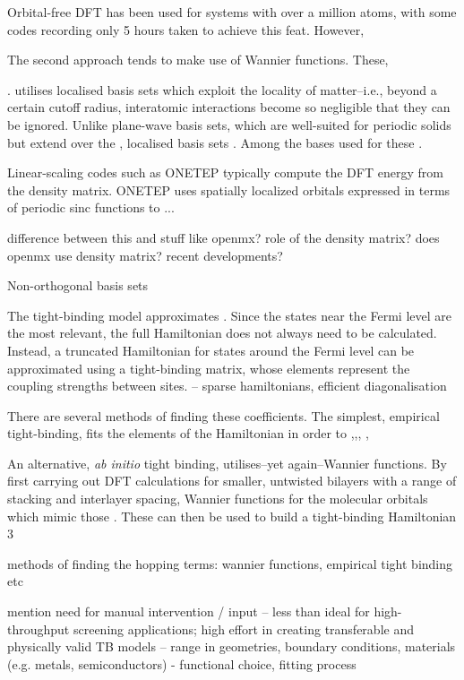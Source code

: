 \documentclass[11pt,a4paper,twoside]{report}  %
\numberwithin{equation}{section}					%
\numberwithin{figure}{section}						%
\newcommand{\red}[1]{{\color{red}#1}}
\begin{document}
Orbital-free DFT has been used for systems with over a million atoms, with some codes recording only 5 hours taken to achieve this feat. However, 

The second approach tends to make use of Wannier functions. These, 


. utilises localised basis sets which exploit the locality of matter--i.e., beyond a certain cutoff radius, interatomic interactions become so negligible that they can be ignored. Unlike plane-wave basis sets, which are well-suited for periodic solids but extend over the , localised basis sets . Among the bases used for these . 

Linear-scaling codes such as ONETEP typically compute the DFT energy from the density matrix. 
ONETEP uses spatially localized orbitals expressed in terms of periodic sinc functions to ...

difference between this and stuff like openmx? role of the density matrix? does openmx use density matrix? recent developments?

Non-orthogonal basis sets 

The tight-binding model approximates .
Since the states near the Fermi level are the most relevant, the full Hamiltonian does not always need to be calculated. Instead, a truncated Hamiltonian for states around the Fermi level can be approximated using a tight-binding matrix, whose elements represent the coupling strengths between sites. -- sparse hamiltonians, efficient diagonalisation 

There are several methods of finding these coefficients. The simplest, empirical tight-binding, fits the elements of the Hamiltonian in order to  ,,, , 

An alternative, \textit{ab initio} tight binding, utilises--yet again--Wannier functions. By first carrying out DFT calculations for smaller, untwisted bilayers with a range of stacking and interlayer spacing, Wannier functions for the molecular orbitals which mimic those . These can then be used to build a tight-binding Hamiltonian 3

\red{methods of finding the hopping terms: wannier functions, empirical tight binding etc}

mention need for manual intervention / input -- less than ideal for high-throughput screening applications; high effort in creating transferable and physically valid TB models -- range in geometries, boundary conditions, materials (e.g. metals, semiconductors) - functional choice, fitting process
\end{document}
